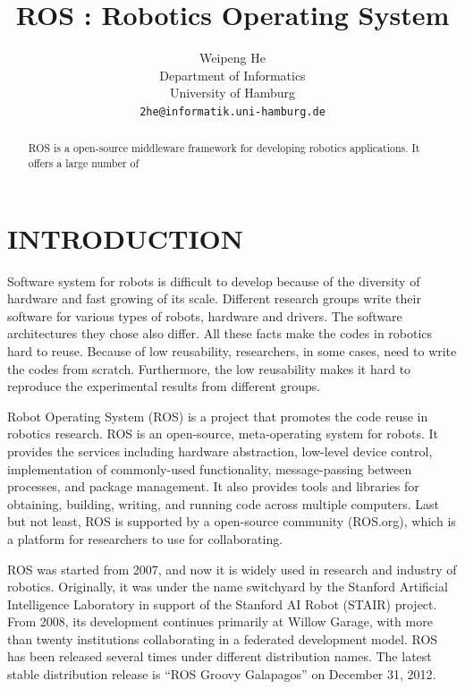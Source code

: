 \documentclass[a4paper, 10pt, conference]{ieeeconf}       %
\title{\LARGE \bf
  ROS : Robotics Operating System
}
\author{
  Weipeng He
\\ Department of Informatics\\ University of Hamburg \\ {\tt\small 2he@informatik.uni-hamburg.de}
}
\begin{document}
\maketitle
\thispagestyle{empty}
\pagestyle{empty}

\begin{abstract}
  ROS is a open-source middleware framework for developing robotics applications. It offers a large number of 
\end{abstract}


\section{INTRODUCTION}

Software system for robots is difficult to develop because of the diversity of hardware and fast growing of its scale. Different research groups write their software for various types of robots, hardware and drivers. The software architectures they chose also differ. All these facts make the codes in robotics hard to reuse. Because of low reusability, researchers, in some cases, need to write the codes from scratch. Furthermore, the low reusability makes it hard to reproduce the experimental results from different groups.

Robot Operating System (ROS) is a project that promotes the code reuse in robotics research\cite{quigley_ros:_2009}. ROS is an open-source, meta-operating system for robots. It provides the services including hardware abstraction, low-level device control, implementation of commonly-used functionality, message-passing between processes, and package management. It also provides tools and libraries for obtaining, building, writing, and running code across multiple computers. Last but not least, ROS is supported by a open-source community (ROS.org), which is a platform for researchers to use for collaborating.

ROS was started from 2007, and now it is widely used in research and industry of robotics. Originally, it was under the name switchyard by the Stanford Artificial Intelligence Laboratory in support of the Stanford AI Robot (STAIR) project. From 2008, its development continues primarily at Willow Garage, with more than twenty institutions collaborating in a federated development model. ROS has been released several times under different distribution names. The latest stable distribution release is ``ROS Groovy Galapagos'' on December 31, 2012\cite{_documentation_2013}.
\end{document}
